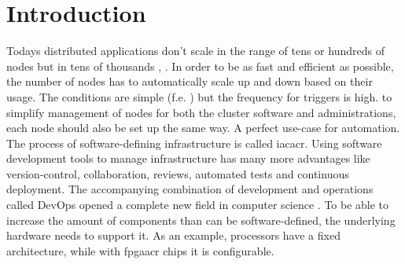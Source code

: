 

\chapter{Introduction}






Todays distributed applications don't scale in the range of tens or hundreds of nodes but in tens of thousands \cite{distributed_systems_concepts}, \cite{cluster_computing_whitepaper} \cite{kubernetes_15000_nodes}. In order to be as fast and efficient as possible, the number of nodes has to automatically scale up and down based on their usage. The conditions are simple (f.e. ) but the frequency for triggers is high. to simplify management of nodes for both the cluster software and administrations, each node should also be set up the same way. A perfect use-case for automation.
\newline
The process of software-defining infrastructure is called \gls{iacacr}. Using software development tools to manage infrastructure has many more advantages like version-control, collaboration, reviews, automated tests and continuous deployment. The accompanying combination of development and operations called DevOps opened a complete new field in computer science \cite{bachelor_thesis}. To be able to increase the amount of components than can be software-defined, the underlying hardware needs to support it. As an example, processors have a fixed architecture, while with \gls{fpgaacr} chips it is configurable.

